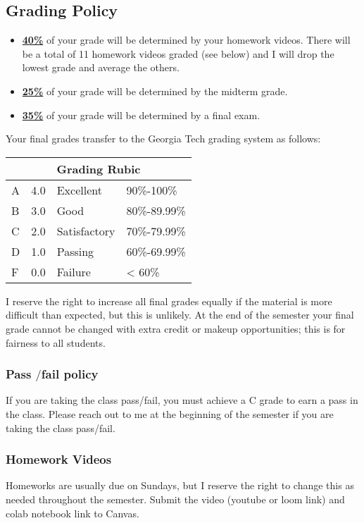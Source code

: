 \documentclass[11pt]{article}
\begin{document}
\subsection*{Grading Policy}
\begin{itemize}
\item \underline{\textbf{40\%}} of your grade will be determined by your homework videos. There will be a total of 11 homework videos graded (see below) and I will drop the lowest grade and average the others. 
\item \underline{\textbf{25\%}} of your grade will be determined by the midterm grade. 
\item \underline{\textbf{35\%}} of your grade will be determined by a final exam.
\end{itemize}


Your final grades transfer to the Georgia Tech
grading system as follows:

\begin{tabular}{ |p{3cm}||p{3cm}|p{3cm}|p{3cm}|  }
  \hline
  \multicolumn{4}{|c|}{Grading Rubic} \\
  \hline
 A & 4.0 &Excellent&90\%-100\%\\
  \hline
  B   & 3.0    &Good&   80\%-89.99\%\\
  \hline
C&  2.0 & Satisfactory   &70\%-79.99\%\\
\hline
D&1.0 & Passing&  60\%-69.99\%\\
\hline
  F    &0.0 & Failure& < 60\%\\
  \hline
 \end{tabular}

 I  reserve   the   right   to   increase   all   final   grades   equally   if   the   material   is   more   difficult   than
 expected, but this is unlikely.   At the end of the semester your final grade cannot be changed
 with extra credit or makeup opportunities; this is for fairness to all students.
 \subsubsection*{Pass $/$fail policy}
 If you are taking the class pass/fail, you must achieve a C grade to earn a pass in the class.
 Please reach out to me at the beginning of the semester if you are taking the class pass/fail.


\subsubsection*{Homework Videos}
Homeworks are usually due on Sundays, but I reserve the right to change this as needed throughout the semester. Submit the video (youtube or loom link) and colab notebook link to Canvas. 
\end{document}
